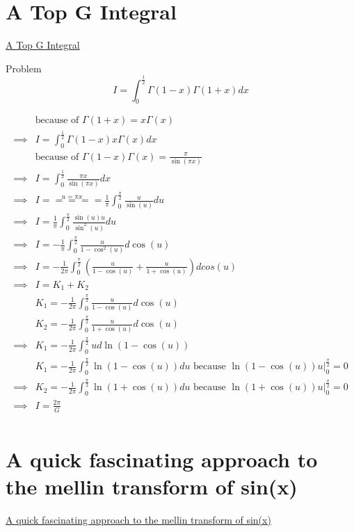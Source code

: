 \documentclass {article}
\begin{document}
\section{A Top G Integral}
\href{https://www.youtube.com/watch?v=pwJOEQPfNfQ}{A Top G Integral}


Problem  \[ I = \int_0^{\frac{1}{2}} \Gamma(1-x)\Gamma(1+x){d}x\]

\[
\begin{matrix}
          &  \text{because of } \Gamma(1+x) = x \Gamma(x)  \\
\implies  & I = \int_0^{\frac{1}{2}} \Gamma(1-x) x \Gamma(x){d}x \\
          & \text{because of  } \Gamma(1-x)\Gamma(x) = \frac{\pi}{\sin(\pi x)} \\
\implies  & I = \int_0^{\frac{1}{2}} \frac{\pi x}{\sin(\pi x)} {d}x \\
\implies  & I \stackrel{u = \pi x} {=====} \frac{1}{\pi} \int_0^{\frac{\pi}{2}} \frac{u}{\sin(u)} {d}u \\
\implies  & I = \frac{1}{\pi} \int_0^{\frac{\pi}{2}} \frac{\sin(u) u }{\sin^2(u)} {d}u \\
\implies  & I = -\frac{1}{\pi} \int_0^{\frac{\pi}{2}} \frac{u}{1 - \cos^2(u)} {d}\cos(u) \\
\implies  & I = -\frac{1}{2\pi} \int_0^{\frac{\pi}{2}} \left( \frac{u}{1-\cos(u)} + \frac{u}{1+\cos(u)} \right) {d}cos(u) \\
\implies  & I = K_1 + K_2 \\
          & K_1 = -\frac{1}{2\pi} \int_0^{\frac{\pi}{2}}  \frac{u}{1-\cos(u)} {d}\cos(u) \\
          & K_2 = -\frac{1}{2\pi} \int_0^{\frac{\pi}{2}}  \frac{u}{1+\cos(u)} {d}\cos(u) \\
\implies & K_1 = -\frac{1}{2\pi} \int_0^{\frac{\pi}{2}}  u {d}\ln(1-\cos(u)) \\
         & K_1 = -\frac{1}{2\pi} \int_0^{\frac{\pi}{2}} \ln(1-\cos(u)){d}u \text{  because  } \ln(1-\cos(u)) u \Big|_0^{\frac{\pi}{2}} = 0\\
\implies & K_2 = -\frac{1}{2\pi} \int_0^{\frac{\pi}{2}} \ln(1 + \cos(u)){d}u \text{  because } \ln(1+\cos(u)) u \Big|_0^{\frac{\pi}{2}} = 0 \\
\implies & I = \frac{2\pi}{G} \\
\end{matrix}
\]

\section{A quick fascinating approach to the mellin transform of sin(x)}
\href{https://www.youtube.com/watch?v=P5Wc6DxUciw}{A quick fascinating approach to the mellin transform of sin(x)}
\end{document}
